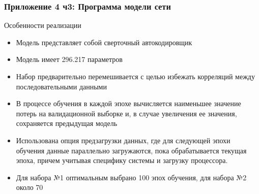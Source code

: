 \documentclass{beamer}
\begin{document}
\begin{frame}
	\frametitle{Приложение 4 ч3: Программа модели сети}
	\begin{block}{Особенности реализации}
	\begin{itemize}
		\item Модель представляет собой сверточный автокодировщик
		\item Модель имеет 296.217 параметров
		\item Набор предварительно перемешивается с целью избежать корреляций между последовательными данными
		\item В процессе обучения в каждой эпохе вычисляется наименьшее значение потерь на валидационной выборке и, в случае увеличения ее значения, сохраняется предыдущая модель
		\item Использована опция предзагрузки данных, где для следующей эпохи обучения данные параллельно загружаются, пока обрабатывается текущая эпоха, причем учитывая специфику системы и загрузку процессора.
		\item Для набора №1 оптимальным выбрано 100 эпох обучения, для набора №2 около 70
	\end{itemize}
	\end{block}
\end{frame}
\end{document}
